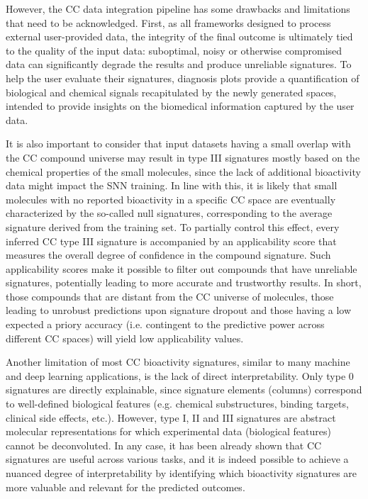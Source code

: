 However, the CC data integration pipeline has some drawbacks and limitations that need to be acknowledged. First, as all frameworks designed to process external user-provided data, the integrity of the final outcome is ultimately tied to the quality of the input data: suboptimal, noisy or otherwise compromised data can significantly degrade the results and produce unreliable signatures. To help the user evaluate their signatures, diagnosis plots provide a quantification of biological and chemical signals recapitulated by the newly generated spaces, intended to provide insights on the biomedical information captured by the user data.

It is also important to consider that input datasets having a small overlap with the CC compound universe may result in type III signatures mostly based on the chemical properties of the small molecules, since the lack of additional bioactivity data might impact the SNN training. In line with this, it is likely that small molecules with no reported bioactivity in a specific CC space are eventually characterized by the so-called null signatures, corresponding to the average signature derived from the training set. To partially control this effect, every inferred CC type III signature is accompanied by an applicability score that measures the overall degree of confidence in the compound signature. Such applicability scores make it possible to filter out compounds that have unreliable signatures, potentially leading to more accurate and trustworthy results. In short, those compounds that are distant from the CC universe of molecules, those leading to unrobust predictions upon signature dropout and those having a low expected a priory accuracy (i.e. contingent to the predictive power across different CC spaces) will yield low applicability values.

Another limitation of most CC bioactivity signatures, similar to many machine and deep learning applications\cite{jimenez-luna_artificial_2021, vamathevan_applications_2019}, is the lack of direct interpretability. Only type 0 signatures are directly explainable, since signature elements (columns) correspond to well-defined biological features (e.g. chemical substructures, binding targets, clinical side effects, etc.). However, type I, II and III signatures are abstract molecular representations for which experimental data (biological features) cannot be deconvoluted. In any case, it has been already shown that CC signatures are useful across various tasks, and it is indeed possible to achieve a nuanced degree of interpretability by identifying which bioactivity signatures are more valuable and relevant for the predicted outcomes\cite{bertoni_bioactivity_2021}. 


